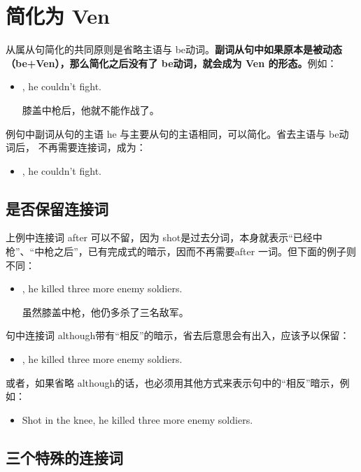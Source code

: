 \section{简化为 Ven}

从属从句简化的共同原则是省略主语与 be动词。\textbf{副词从句中如果原本是被动态
  （be+Ven），那么简化之后没有了 be动词，就会成为 Ven 的形态。}例如：

\begin{itemize}
\item {}, he couldn't fight.

  膝盖中枪后，他就不能作战了。
\end{itemize}
例句中副词从句的主语 he 与主要从句的主语相同，可以简化。省去主语与 be动词后，
不再需要连接词，成为：
\begin{itemize}
\item {}, he couldn't fight.
\end{itemize}

\subsection{是否保留连接词}

上例中连接词 after 可以不留，因为 shot是过去分词，本身就表示“已经中
枪”、“中枪之后”，已有完成式的暗示，因而不再需要after 一词。但下面的例子则
不同：
\begin{itemize}
\item {}, he killed three more enemy soldiers.

  虽然膝盖中枪，他仍多杀了三名敌军。
\end{itemize}
句中连接词 although带有“相反”的暗示，省去后意思会有出入，应该予以保留：
\begin{itemize}
\item {}, he killed three more enemy soldiers.
\end{itemize}
或者，如果省略 although的话，也必须用其他方式来表示句中的“相反”暗示，例如：
\begin{itemize}
\item Shot in the knee, he  killed three more enemy soldiers.
\end{itemize}

\subsection{三个特殊的连接词}


